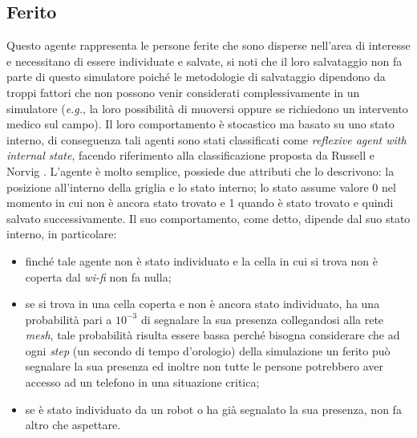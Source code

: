 \subsection{Ferito}
Questo agente rappresenta le persone ferite che sono disperse nell'area di interesse e necessitano di essere individuate e salvate, si noti che il loro salvataggio non fa parte di questo simulatore poiché le metodologie di salvataggio dipendono da troppi fattori che non possono venir considerati complessivamente in un simulatore (\textit{e.g.}, la loro possibilità di muoversi oppure se richiedono un intervento medico sul campo).
Il loro comportamento è stocastico ma basato su uno stato interno, di conseguenza tali agenti sono stati classificati come \textit{reflexive agent with internal state}, facendo riferimento alla classificazione proposta da Russell e Norvig \cite{russell2016}.
L'agente è molto semplice, possiede due attributi che lo descrivono: la posizione all'interno della griglia e lo stato interno; lo stato assume valore 0 nel momento in cui non è ancora stato trovato e 1 quando è stato trovato e quindi salvato successivamente.
Il suo comportamento, come detto, dipende dal suo stato interno, in particolare: 
\begin{itemize}
	\item finché tale agente non è stato individuato e la cella in cui si trova non è coperta dal \textit{wi-fi} non fa nulla;
	\item se si trova in una cella coperta e non è ancora stato individuato, ha una probabilità pari a $10^{-3}$ di segnalare la sua presenza collegandosi alla rete \textit{mesh}, tale probabilità risulta essere bassa perché bisogna considerare che ad ogni \textit{step} (un secondo di tempo d'orologio) della simulazione un ferito può segnalare la sua presenza ed inoltre non tutte le persone potrebbero aver accesso ad un telefono in una situazione critica;
	\item se è stato individuato da un robot o ha già segnalato la sua presenza, non fa altro che aspettare.
\end{itemize}
